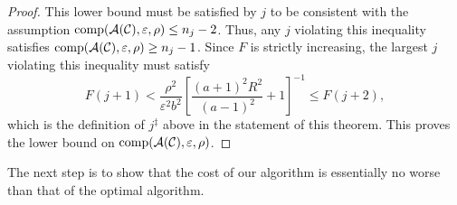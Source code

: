 \documentclass[graybox,footinfo]{svmult}
\begin{document}
\begin{proof}
This lower bound must be satisfied by $j$ to be consistent with the assumption $\textup{comp}({\mathcal{A}}({\mathcal{C}}),\varepsilon,\rho) \le n_j - 2$.  Thus, any $j$ violating this inequality satisfies $\textup{comp}({\mathcal{A}}({\mathcal{C}}),\varepsilon,\rho) \ge n_j - 1$.  Since $F$ is strictly increasing, the largest $j$ violating this inequality must satisfy
\begin{equation}
F(j+1) < \frac{\rho^2}{\varepsilon^2 b^2}
\left[\frac{(a+1)^{2} R^2 }{(a-1)^2} + 1\right]^{-1} \le F(j+2),
\end{equation}
which is the definition of  $j^\ddagger$ above in the statement of this theorem.  This proves the lower bound on $\textup{comp}({\mathcal{A}}({\mathcal{C}}),\varepsilon,\rho)$. 
\end{proof}

The next step is to show that the cost of our algorithm is essentially no worse than that of the optimal algorithm.
\end{document}
